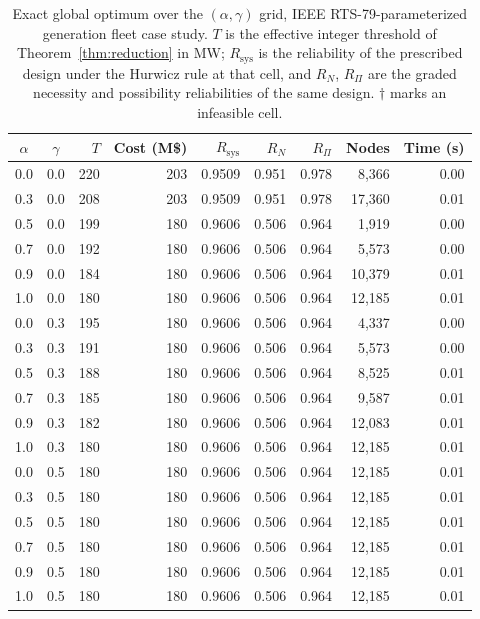\begin{table}[!htbp]
\centering
\caption{Exact global optimum over the $(\alpha,\gamma)$ grid, IEEE RTS-79-parameterized generation fleet case study. $T$ is the effective integer threshold of Theorem~\ref{thm:reduction} in MW; $R_{\mathrm{sys}}$ is the reliability of the prescribed design under the Hurwicz rule at that cell, and $R_N$, $R_\Pi$ are the graded necessity and possibility reliabilities of the same design. $\dagger$ marks an infeasible cell.}
\label{tab:power_rts_stats}
\small
\begin{tabular}{ccrrrrrrr}
\hline
$\alpha$ & $\gamma$ & $T$ & Cost (M\$) & $R_{\mathrm{sys}}$ & $R_N$ & $R_\Pi$ & Nodes & Time (s)\\
\hline
0.0 & 0.0 & 220 & 203 & 0.9509 & 0.951 & 0.978 & 8,366 & 0.00 \\
0.3 & 0.0 & 208 & 203 & 0.9509 & 0.951 & 0.978 & 17,360 & 0.01 \\
0.5 & 0.0 & 199 & 180 & 0.9606 & 0.506 & 0.964 & 1,919 & 0.00 \\
0.7 & 0.0 & 192 & 180 & 0.9606 & 0.506 & 0.964 & 5,573 & 0.00 \\
0.9 & 0.0 & 184 & 180 & 0.9606 & 0.506 & 0.964 & 10,379 & 0.01 \\
1.0 & 0.0 & 180 & 180 & 0.9606 & 0.506 & 0.964 & 12,185 & 0.01 \\
\hline
0.0 & 0.3 & 195 & 180 & 0.9606 & 0.506 & 0.964 & 4,337 & 0.00 \\
0.3 & 0.3 & 191 & 180 & 0.9606 & 0.506 & 0.964 & 5,573 & 0.00 \\
0.5 & 0.3 & 188 & 180 & 0.9606 & 0.506 & 0.964 & 8,525 & 0.01 \\
0.7 & 0.3 & 185 & 180 & 0.9606 & 0.506 & 0.964 & 9,587 & 0.01 \\
0.9 & 0.3 & 182 & 180 & 0.9606 & 0.506 & 0.964 & 12,083 & 0.01 \\
1.0 & 0.3 & 180 & 180 & 0.9606 & 0.506 & 0.964 & 12,185 & 0.01 \\
\hline
0.0 & 0.5 & 180 & 180 & 0.9606 & 0.506 & 0.964 & 12,185 & 0.01 \\
0.3 & 0.5 & 180 & 180 & 0.9606 & 0.506 & 0.964 & 12,185 & 0.01 \\
0.5 & 0.5 & 180 & 180 & 0.9606 & 0.506 & 0.964 & 12,185 & 0.01 \\
0.7 & 0.5 & 180 & 180 & 0.9606 & 0.506 & 0.964 & 12,185 & 0.01 \\
0.9 & 0.5 & 180 & 180 & 0.9606 & 0.506 & 0.964 & 12,185 & 0.01 \\
1.0 & 0.5 & 180 & 180 & 0.9606 & 0.506 & 0.964 & 12,185 & 0.01 \\

\end{tabular}
\end{table}
